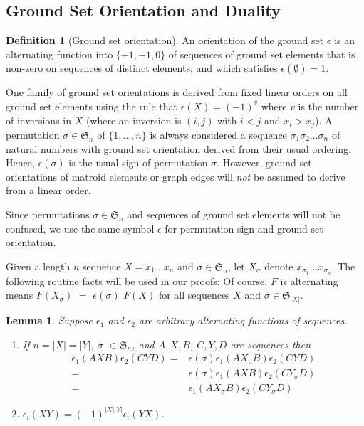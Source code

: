 \documentclass[12pt]{article}
\newtheorem{lemma}[theorem]{Lemma}
\theoremstyle{definition}
\newtheorem{definition}[theorem]{Definition}
\newcommand{\Perms}{\ensuremath{\mathfrak{S}}}
\newcommand{\Card}[1]{\ensuremath{{\left|#1\right|}}}
\begin{document}
\subsection{Ground Set Orientation and Duality}

\begin{definition}[Ground set orientation]
An orientation of the ground set $\epsilon$ is an alternating function
into $\{+1, -1, 0\}$ of sequences of ground set elements that is 
non-zero on sequences of distinct elements, and which satisfies
$\epsilon(\emptyset)=1$.
\end{definition}

One family of ground set orientations is derived from fixed linear
orders on all ground set elements using the rule that
$\epsilon(X)=(-1)^v$ where $v$ is the number of inversions in $X$
(where an inversion is $(i,j)$ with $i<j$ and $x_i>x_j$).  A permutation 
$\sigma\in\Perms_n$ of $\{1,\ldots,n\}$ is always considered a sequence
$\sigma_1\sigma_2\ldots\sigma_n$ of natural numbers 
with ground set orientation derived from their usual ordering.
Hence, $\epsilon(\sigma)$ is the usual sign of permutation $\sigma$.
However, ground set orientations of matroid elements or graph edges
will \emph{not} be assumed to derive from a linear order. 

Since permutations $\sigma\in\Perms_n$ and sequences of ground set
elements will not be confused, we use the same symbol $\epsilon$
for permutation sign and ground set orientation.

Given a length $n$ sequence $X=x_1\ldots x_n$ and $\sigma\in\Perms_n$,
let $X_\sigma$ denote $x_{\sigma_1}\ldots x_{\sigma_n}$.
The following routine facts will be used in our proofs:  Of course,
$F$ is alternating means $F(X_\sigma)$ $=$ $\epsilon(\sigma)$
$F(X)$ for all sequences $X$ and $\sigma\in\Perms_{\Card{X}}$.
\begin{lemma}%
\label{lemmaEpsilonFacts}
Suppose $\epsilon_1$ and $\epsilon_2$ are arbitrary alternating 
functions of sequences.
\begin{enumerate}
\item If $n=|X|=|Y|$, $\sigma$ $\in \Perms_n$,
and $A, X, B$, $C, Y, D$ are sequences then
\begin{eqnarray*}
\epsilon_1(AXB)\epsilon_2(CYD)=&
\epsilon(\sigma)\epsilon_1(AX_\sigma B)\epsilon_2(CYD) \\
                              =&
\epsilon(\sigma)\epsilon_1(AXB)\epsilon_2(CY_\sigma D) \\
                              =&
\epsilon_1(AX_\sigma B)\epsilon_2(CY_\sigma D)
\end{eqnarray*}

\item 
$\epsilon_i(XY) =
(-1)^{|X||Y|}\epsilon_i(YX)$.
\end{enumerate}
\end{lemma}
\end{document}
